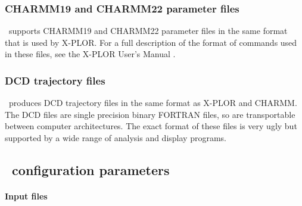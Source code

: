 \subsubsection{CHARMM19 and CHARMM22 parameter files}

\NAMD\ supports CHARMM19 and CHARMM22 parameter files in the same format 
that is used by X-PLOR.  
For a full description of the format of commands 
used in these files, see the X-PLOR User's Manual 
.  

\subsubsection{DCD trajectory files}

\NAMD\ produces DCD trajectory files in the same format as 
X-PLOR and CHARMM.  
The DCD files are single precision binary FORTRAN files, 
so are transportable between computer architectures.  
The exact format of these files is very ugly but supported by 
a wide range of analysis and display programs.  

\subsection{\NAMD\ configuration parameters}
\label{section:file_config}

\paragraph{Input files}

